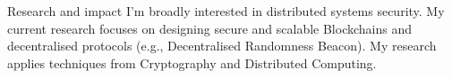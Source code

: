 \documentclass{resume} %
\begin{document}
\begin{rSection}{Research and impact}
    I'm broadly interested in distributed systems security.
    My current research focuses on designing secure and scalable Blockchains and decentralised protocols (e.g., Decentralised Randomness Beacon).
    My research applies techniques from Cryptography and Distributed Computing.


\end{rSection}
\end{document}
